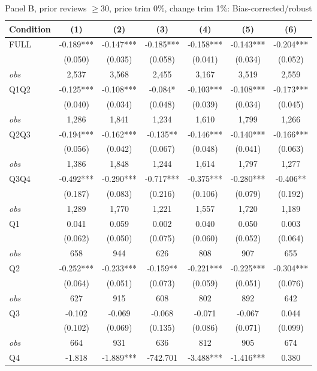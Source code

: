 \documentclass[11pt]{article}
\begin{document}
\begin{table}[!htbp]
\centering
\caption{Panel B, prior reviews $\geq 30$, price trim 0\%, change trim 1\%: Bias-corrected/robust}
\label{tab:b:trim01:reviews30:robust}
\small
\begin{tabular}{lcccccc}
\toprule
Condition & (1) & (2) & (3) & (4) & (5) & (6) \\
\midrule
FULL & -0.189*** & -0.147*** & -0.185*** & -0.158*** & -0.143*** & -0.204*** \\
 & (0.050) & (0.035) & (0.058) & (0.041) & (0.034) & (0.052) \\
\textit{obs} & 2,537 & 3,568 & 2,455 & 3,167 & 3,519 & 2,559 \\
Q1Q2 & -0.125*** & -0.108*** & -0.084* & -0.103*** & -0.108*** & -0.173*** \\
 & (0.040) & (0.034) & (0.048) & (0.039) & (0.034) & (0.045) \\
\textit{obs} & 1,286 & 1,841 & 1,234 & 1,610 & 1,799 & 1,266 \\
Q2Q3 & -0.194*** & -0.162*** & -0.135** & -0.146*** & -0.140*** & -0.166*** \\
 & (0.056) & (0.042) & (0.067) & (0.048) & (0.041) & (0.063) \\
\textit{obs} & 1,386 & 1,848 & 1,244 & 1,614 & 1,797 & 1,277 \\
Q3Q4 & -0.492*** & -0.290*** & -0.717*** & -0.375*** & -0.280*** & -0.406** \\
 & (0.187) & (0.083) & (0.216) & (0.106) & (0.079) & (0.192) \\
\textit{obs} & 1,289 & 1,770 & 1,221 & 1,557 & 1,720 & 1,189 \\
Q1 & 0.041 & 0.059 & 0.002 & 0.040 & 0.050 & 0.003 \\
 & (0.062) & (0.050) & (0.075) & (0.060) & (0.052) & (0.064) \\
\textit{obs} & 658 & 944 & 626 & 808 & 907 & 655 \\
Q2 & -0.252*** & -0.233*** & -0.159** & -0.221*** & -0.225*** & -0.304*** \\
 & (0.064) & (0.051) & (0.073) & (0.059) & (0.051) & (0.076) \\
\textit{obs} & 627 & 915 & 608 & 802 & 892 & 642 \\
Q3 & -0.102 & -0.069 & -0.068 & -0.071 & -0.067 & 0.044 \\
 & (0.102) & (0.069) & (0.135) & (0.086) & (0.071) & (0.099) \\
\textit{obs} & 664 & 931 & 636 & 812 & 905 & 674 \\
Q4 & -1.818 & -1.889*** & -742.701 & -3.488*** & -1.416*** & 0.380 \\

\end{tabular}
\end{table}
\end{document}
